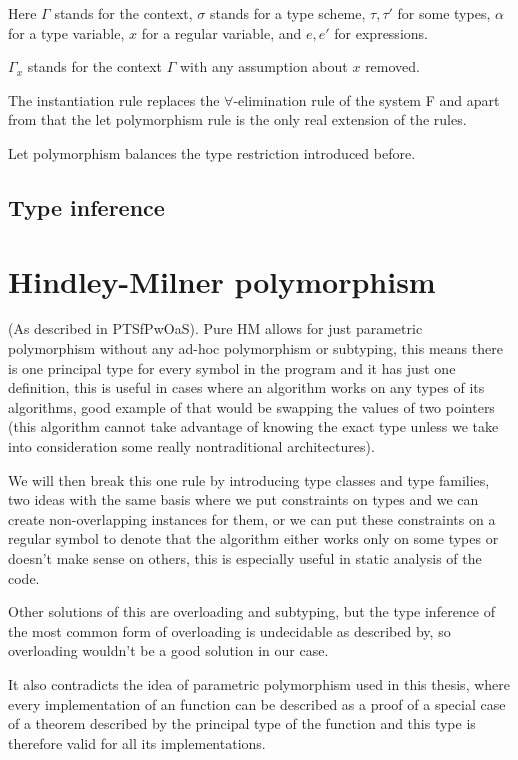 Here $\Gamma$ stands for the context, $\sigma$ stands for a type scheme, $\tau, \tau'$ for some types, $\alpha$ for a type variable, $x$ for a regular variable, and $e, e'$ for expressions.

$\Gamma_x$ stands for the context $\Gamma$ with any assumption about $x$ removed.

The instantiation rule replaces the $\forall$-elimination rule of the system F and apart from that the let polymorphism rule is the only real extension of the rules.

Let polymorphism balances the type restriction introduced before.

\subsection{Type inference}


\section{Hindley-Milner polymorphism}

(As described in PTSfPwOaS).
Pure HM allows for just parametric polymorphism without any ad-hoc polymorphism
or subtyping, this means there is one principal type for every symbol in the program and it has just one definition, this is useful in cases
where an algorithm works on any types of its algorithms, good example of that would be swapping the values of two pointers (this algorithm cannot
take advantage of knowing the exact type unless we take into consideration some really nontraditional architectures).

We will then break this one
rule by introducing type classes and type families, two ideas with the same basis where we put constraints on types and we can
create non-overlapping instances for them, or we can put these constraints on a regular symbol to denote that the algorithm either works only on
some types or doesn't make sense on others, this is especially useful in static analysis of the code.

Other solutions of this are overloading and subtyping, but the type inference of the most common form of overloading is undecidable
as described by, so overloading wouldn't be a good solution in our case. %

It also contradicts the idea of parametric polymorphism used in this thesis, where every implementation of an function can be
described as a proof of a special case of a theorem described by the principal type of the function and this type is therefore
valid for all its implementations.

